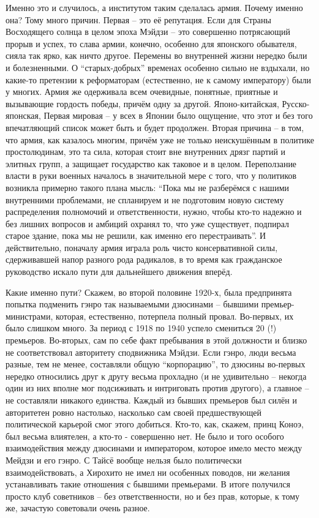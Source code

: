 Именно это и случилось, а институтом таким сделалась армия. Почему именно она? Тому много причин. Первая – это её репутация. Если для Страны Восходящего солнца в целом эпоха Мэйдзи – это совершенно потрясающий прорыв и успех, то слава армии, конечно, особенно для японского обывателя, сияла так ярко, как ничто другое. Перемены во внутренней жизни нередко были и болезненными. О “старых-добрых” временах особенно сильно не вздыхали, но какие-то претензии к реформаторам (естественно, не к самому императору) были у многих. Армия же одерживала всем очевидные, понятные, приятные и вызывающие гордость победы, причём одну за другой. Японо-китайская, Русско-японская, Первая мировая – у всех в Японии было ощущение, что этот и без того впечатляющий список может быть и будет продолжен. Вторая причина – в том, что армия, как казалось многим, причём уже не только неискушённым в политике простолюдинам, это та сила, которая стоит вне внутренних дрязг партий и элитных групп, а защищает государство как таковое и в целом. Переползание власти в руки военных началось в значительной мере с того, что у политиков возникла примерно такого плана мысль: “Пока мы не разберёмся с нашими внутренними проблемами, не спланируем и не подготовим новую систему распределения полномочий и ответственности, нужно, чтобы кто-то надежно и без лишних вопросов и амбиций охранял то, что уже существует, подпирал старое здание, пока мы не решили, как именно его перестраивать”. И действительно, поначалу армия играла роль чисто консервативной силы, сдерживавшей напор разного рода радикалов, в то время как гражданское руководство искало пути для дальнейшего движения вперёд.

Какие именно пути? Скажем, во второй половине 1920-х, была предпринята попытка подменить гэнро так называемыми дзюсинами – бывшими премьер-министрами, которая, естественно, потерпела полный провал. Во-первых, их было слишком много. За период с 1918 по 1940 успело смениться 20 (!) премьеров. Во-вторых, сам по себе факт пребывания в этой должности и близко не соответствовал авторитету сподвижника Мэйдзи. Если гэнро, люди весьма разные, тем не менее, составляли общую “корпорацию”, то дзюсины во-первых нередко относились друг к другу весьма прохладно (и не удивительно – некогда один из них вполне мог подсиживать и интриговать против другого), а главное – не составляли никакого единства. Каждый из бывших премьеров был силён и авторитетен ровно настолько, насколько сам своей предшествующей политической карьерой смог этого добиться. Кто-то, как, скажем, принц Коноэ, был весьма влиятелен, а кто-то - совершенно нет. Не было и того особого взаимодействия между дзюсинами и императором, которое имело место между Мейдзи и его гэнро. С Тайсё вообще нельзя было политически взаимодействовать, а Хирохито не имел ни особенных поводов, ни желания устанавливать такие отношения с бывшими премьерами. В итоге получился просто клуб советников – без ответственности, но и без прав, которые, к тому же, зачастую советовали очень разное.

